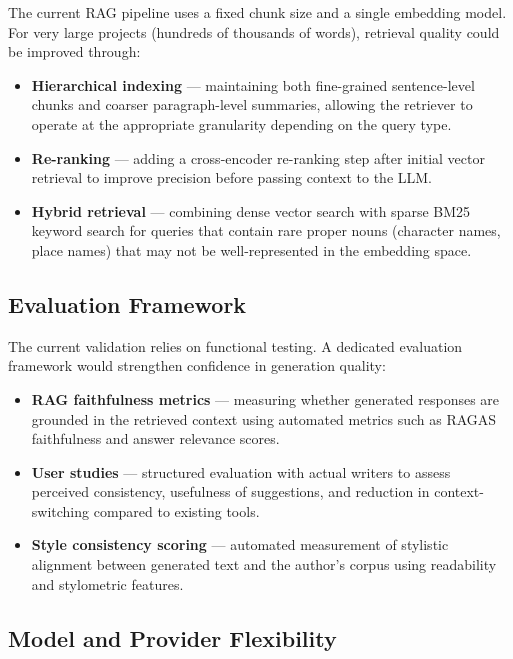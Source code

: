The current RAG pipeline uses a fixed chunk size and a single embedding model. For very large projects (hundreds of thousands of words), retrieval quality could be improved through:

\begin{itemize}
    \item \textbf{Hierarchical indexing} — maintaining both fine-grained sentence-level chunks and coarser paragraph-level summaries, allowing the retriever to operate at the appropriate granularity depending on the query type.
    \item \textbf{Re-ranking} — adding a cross-encoder re-ranking step after initial vector retrieval to improve precision before passing context to the LLM.
    \item \textbf{Hybrid retrieval} — combining dense vector search with sparse BM25 keyword search for queries that contain rare proper nouns (character names, place names) that may not be well-represented in the embedding space.
\end{itemize}

\subsection{Evaluation Framework}

The current validation relies on functional testing. A dedicated evaluation framework would strengthen confidence in generation quality:

\begin{itemize}
    \item \textbf{RAG faithfulness metrics} — measuring whether generated responses are grounded in the retrieved context using automated metrics such as RAGAS faithfulness and answer relevance scores.
    \item \textbf{User studies} — structured evaluation with actual writers to assess perceived consistency, usefulness of suggestions, and reduction in context-switching compared to existing tools.
    \item \textbf{Style consistency scoring} — automated measurement of stylistic alignment between generated text and the author's corpus using readability and stylometric features.
\end{itemize}

\subsection{Model and Provider Flexibility}

